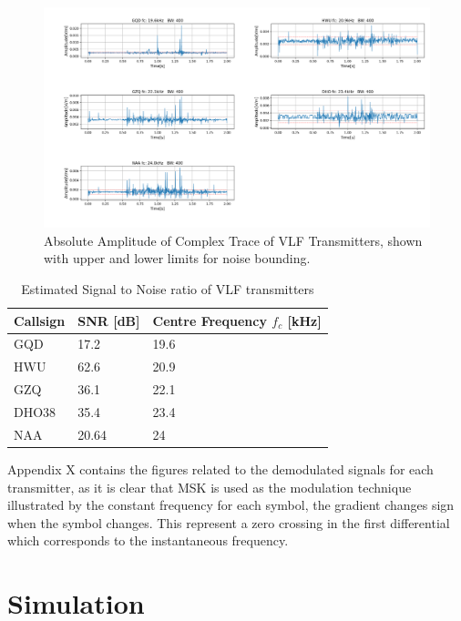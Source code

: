 \begin{figure}[h!]
    \centering
    \includegraphics[width = \textwidth]{figs/sig_character/abs_amplitude.png}
    \caption{\centering Absolute Amplitude of Complex Trace of VLF Transmitters, shown with upper and lower limits for noise bounding.}
    \label{fig:absAmplitude}
\end{figure}

\begin{table}[h!]
\centering
    \begin{tabular}{l|l|l}
    Callsign & SNR [dB] & Centre Frequency $f_c$ [kHz] \\
    \hline
    GQD & 17.2 & 19.6 \\
    HWU & 62.6 & 20.9 \\
    GZQ & 36.1 & 22.1 \\
    DHO38 & 35.4 & 23.4 \\
    NAA & 20.64 & 24
    \end{tabular}
\caption{Estimated Signal to Noise ratio of VLF transmitters}
\label{tab:snr1}
\end{table}

Appendix X contains the figures related to the demodulated signals for each transmitter, as it is clear that MSK is used as the modulation technique illustrated by the constant frequency for each symbol, the gradient changes sign when the symbol changes. This represent a zero crossing in the first differential which corresponds to the instantaneous frequency.
\pagebreak
\section{Simulation}
